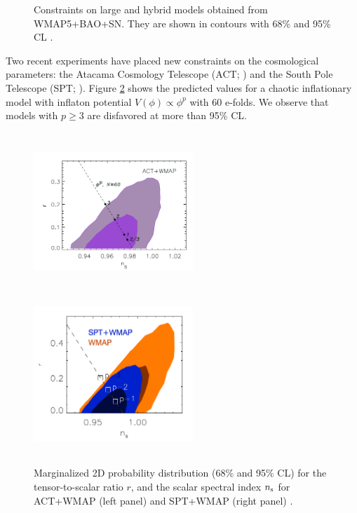 \documentclass{rmaa}
\begin{document}
\begin{figure}[h!]
\centerline{ \epsfxsize=190pt  }
\caption{Constraints on large and hybrid models obtained from WMAP5+BAO+SN.
They are shown in contours with 68\% and 95\% CL
 \citep{Komatsu}.}
 \label{fig:Komatsu2}
\end{figure}

Two recent experiments have placed new constraints on the cosmological parameters: the Atacama
Cosmology Telescope (ACT; \citet{ACT}) and the South Pole Telescope (SPT; \citet{SPT}).
Figure \ref{fig:SPT} shows the predicted values for a chaotic inflationary model with inflaton
potential $V(\phi)\propto\phi^p$ with 60 e-folds. We observe that models with $p\ge3$
are disfavored at more than 95\% CL.


\begin{figure}[h!]
 \includegraphics[trim = 1mm 1mm 1mm 1mm, clip, width=6cm, height=6cm]{ACT}
  \includegraphics[trim = 1mm 1mm 1mm 1mm, clip, width=6cm, height=6cm]{SPT}
\caption{Marginalized 2D probability distribution (68\% and 95\% CL) for the 
tensor-to-scalar ratio $r$, and the scalar spectral index $n_{\rm s}$ for ACT+WMAP (left panel)
and SPT+WMAP (right panel)
 \citep{ACT,SPT}.}
 \label{fig:SPT}
\end{figure}
\end{document}
